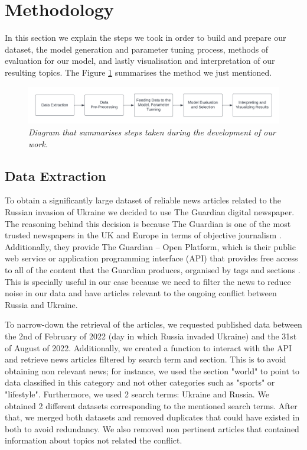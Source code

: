 \documentclass[twoside,12pt,a4paper]{article}
\begin{document}
\clearpage
\section{Methodology}
In this section we explain the steps we took in order to build and prepare our dataset, the model generation and parameter tuning process, methods of evaluation for our model, and lastly visualisation and interpretation of our resulting topics. The Figure \ref{fig:method_1} summarises the method we just mentioned.\\

\begin{figure}[h]
\centering
\includegraphics[scale=0.6]{method_1.png}
\caption{\textit{Diagram that summarises steps taken during the development of our work.}}
\label{fig:method_1}
\end{figure}

\subsection{Data Extraction}
To obtain a significantly large dataset of reliable news articles related to the Russian invasion of Ukraine we decided to use The Guardian digital newspaper. The reasoning behind this decision is because The Guardian is one of the most trusted newspapers in the UK and Europe in terms of objective journalism \citep{matsa_western_2018}. Additionally, they provide The Guardian – Open Platform, which is their public web service or application programming interface (API) that provides free access to all of the content that the Guardian produces, organised by tags and sections \citep{noauthor_theguardian_nodate}. This is specially useful in our case because we need to filter the news to reduce noise in our data and have articles relevant to the ongoing conflict between Russia and Ukraine.

To narrow-down the retrieval of the articles, we requested published data between the 2nd of February of 2022 (day in which Russia invaded Ukraine) and the 31st of August of 2022. Additionally, we created a function to interact with the API and retrieve news articles filtered by search term and section. This is to avoid obtaining non relevant news; for instance, we used the section "world" to point to data classified in this category and not other categories such as "sports" or "lifestyle". Furthermore, we used 2 search terms: Ukraine and Russia. We obtained 2 different datasets corresponding to the mentioned search terms. After that, we merged both datasets and removed duplicates that could have existed in both to avoid redundancy. We also removed non pertinent articles that contained information about topics not related the conflict.
\end{document}
